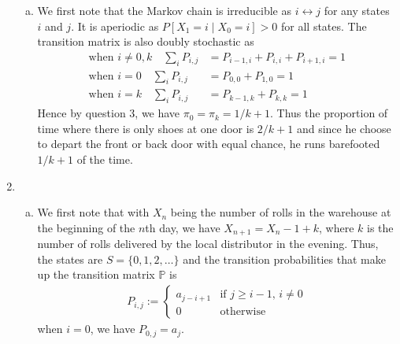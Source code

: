 \documentclass[a4paper,10pt]{article}
\theoremstyle{definition}
\begin{document}
\begin{enumerate}
\begin{enumerate}[(a)]
\item We first note that the Markov chain is irreducible as $i\leftrightarrow j$ for any states $i$ and $j$. It is aperiodic as $P\left[X_1=i\mid X_0=i\right] >0$ for all states. The transition matrix is also doubly stochastic as 
\begin{align*}
\text{when $i \neq 0,k$} \quad\sum_{i}P_{i,j}&=P_{i-1,i}+P_{i,i}+P_{i+1,i}=1  \\
\text{when $i = 0$} \quad \sum_{i}P_{i,j}&=P_{0,0}+P_{1,0}=1  \\
\text{when $i = k$} \quad\sum_{i}P_{i,j}&=P_{k-1,k}+P_{k,k}=1 
\end{align*}
Hence by question 3, we have $\pi_0=\pi_k=1/k+1$. Thus the proportion of time where there is only shoes at one door is $2/k+1$ and since he choose to depart the front or back door with equal chance, he runs barefooted $1/k+1$ of the time.
\end{enumerate}
\item
\begin{enumerate}[(a)]
\item We first note that with $X_n$ being the number of rolls in the warehouse at the beginning of the $n$th day, we have $X_{n+1}=X_n-1+k$, where $k$ is the number of rolls delivered by the local distributor in the evening. Thus, the states are $S=\{0,1,2,\ldots\}$ and the transition probabilities that make up the transition matrix $\mathbb{P}$ is
\begin{align*}
P_{i,j}:=\begin{cases}
a_{j-i+1} & \text{if $j\geq i-1$, $i\neq 0$}\\
0 & \text{otherwise}
\end{cases}
\end{align*}
when $i=0$, we have $P_{0,j}=a_j$.

\end{enumerate}
\end{enumerate}
\end{document}
